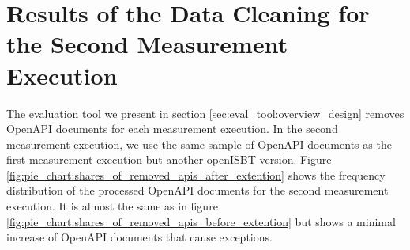 \cleardoublepage
\section{Results of the Data Cleaning for the Second Measurement Execution}
\label{app:results_data_cleaning2}
The evaluation tool we present in section \ref{sec:eval_tool:overview_design} removes OpenAPI documents for each measurement execution. In the second measurement execution, we use the same sample of OpenAPI documents as the first measurement execution but another openISBT version. Figure \ref{fig:pie_chart:shares_of_removed_apis_after_extention} shows the frequency distribution of the processed OpenAPI documents for the second measurement execution. It is almost the same as in figure \ref{fig:pie_chart:shares_of_removed_apis_before_extention} but shows a minimal increase of OpenAPI documents that cause exceptions. 
